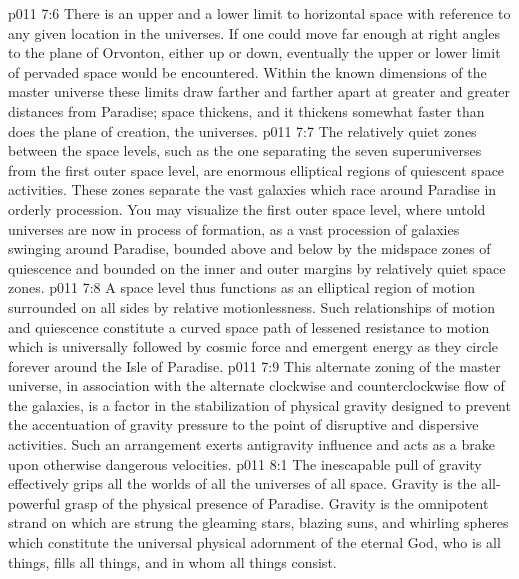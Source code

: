 \vs p011 7:6 There is an upper and a lower limit to horizontal space with reference to any given location in the universes. If one could move far enough at right angles to the plane of Orvonton, either up or down, eventually the upper or lower limit of pervaded space would be encountered. Within the known dimensions of the master universe these limits draw farther and farther apart at greater and greater distances from Paradise; space thickens, and it thickens somewhat faster than does the plane of creation, the universes.
\vs p011 7:7 \pc The relatively quiet zones between the space levels, such as the one separating the seven superuniverses from the first outer space level, are enormous elliptical regions of quiescent space activities. These zones separate the vast galaxies which race around Paradise in orderly procession. You may visualize the first outer space level, where untold universes are now in process of formation, as a vast procession of galaxies swinging around Paradise, bounded above and below by the midspace zones of quiescence and bounded on the inner and outer margins by relatively quiet space zones.
\vs p011 7:8 A space level thus functions as an elliptical region of motion surrounded on all sides by relative motionlessness. Such relationships of motion and quiescence constitute a curved space path of lessened resistance to motion which is universally followed by cosmic force and emergent energy as they circle forever around the Isle of Paradise.
\vs p011 7:9 This alternate zoning of the master universe, in association with the alternate clockwise and counterclockwise flow of the galaxies, is a factor in the stabilization of physical gravity designed to prevent the accentuation of gravity pressure to the point of disruptive and dispersive activities. Such an arrangement exerts antigravity influence and acts as a brake upon otherwise dangerous velocities.
\vs p011 8:1 The inescapable pull of gravity effectively grips all the worlds of all the universes of all space. Gravity is the all\hyp{}powerful grasp of the physical presence of Paradise. Gravity is the omnipotent strand on which are strung the gleaming stars, blazing suns, and whirling spheres which constitute the universal physical adornment of the eternal God, who is all things, fills all things, and in whom all things consist.
